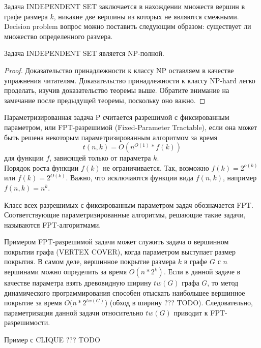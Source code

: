     \begin{Def}
        Задача INDEPENDENT SET заключается в нахождении множеств  вершин в графе размера $k$, никакие две вершины из которых не являются смежными. Decision problem вопрос можно поставить следующим образом: существует ли множество определенного размера.
    \end{Def}
    \begin{Thm}
        Задача INDEPENDENT SET является NP-полной. 
    \end{Thm}
    \begin{proof}
        Доказательство принадлежности к классу NP оставляем в качестве упражнения читателям. Доказательство принадлежности к классу NP-hard легко проделать, изучив доказательство теоремы выше. Обратите внимание на замечание после предыдущей теоремы, поскольку оно важно.
    \end{proof}
    
    
    \begin{Def}
        Параметризированная задача P считается разрешимой с фиксированным параметром, или FPT-разрешимой (Fixed-Parameter Tractable), если она может быть решена некоторым параметризированным алгоритмом за время
        $$t(n, k) = O(n^{O(1)} * f(k))$$
        для функции $f$, зависящей только от параметра $k$.\\ 
        Порядок роста функции $f(k)$ не ограничивается. Так, возможно $f(k) = 2^{o(k)}$ или $f(k) = 2^{O(k)}$. Важно, что исключаются функции вида $f(n, k)$, например $f(n, k) = n^k$.
    \end{Def}
    \begin{Rem}
        Класс всех разрешимых с фиксированным параметром задач обозначается FPT. Соответствующие параметризированные алгоритмы, решающие такие задачи, называются FPT-алгоритмами.
    \end{Rem}
    \begin{Example}
        Примером FPT-разрешимой задачи может служить задача о вершинном покрытии графа (VERTEX COVER), когда параметром выступает размер покрытия. В самом деле, вершинное покрытие размера $k$ в графе $G$ с $n$ вершинами можно определить за время $O(n*2^k)$. Если в данной задаче в качестве параметра взять древовидную ширину $tw(G)$ графа $G$, то метод динамического программирования способен отыскать наибольшее вершинное покрытие за время $O(n * 2^{tw(G)}$) (обход в ширину ??? TODO). Следовательно, параметризация данной задачи относительно $tw(G)$ приводит к FPT-разрешимости.
    \end{Example}
    \begin{Example}
        Пример с CLIQUE ??? TODO
    \end{Example}

